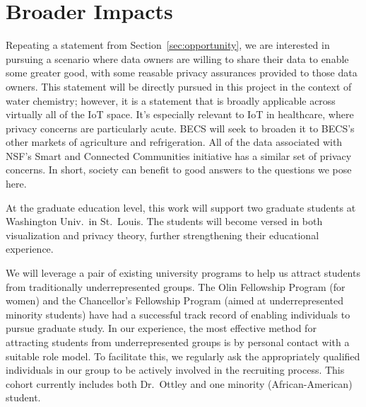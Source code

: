 \section{Broader Impacts}
\label{sec:broader}

Repeating a statement from Section~\ref{sec:opportunity},
we are interested in pursuing a scenario
where data owners are willing to share their data to enable some greater
good, with some reasable privacy assurances provided to those data owners.
This statement will be directly pursued in this project in the context of water
chemistry; however, it is a statement that is broadly applicable
across virtually all of the IoT space.
It's especially relevant to IoT in healthcare, where privacy concerns
are particularly acute.
BECS will seek to broaden it to BECS's other markets of agriculture
and refrigeration.
All of the data associated with NSF's Smart and Connected Communities
initiative has a similar set of privacy concerns.
In short, society can benefit to good answers to the questions we pose here.

At the graduate education level, this work will support two graduate
students at Washington Univ.~in St.~Louis.
The students will become versed in both visualization and
privacy theory, further strengthening their educational experience.

We will leverage a pair of existing university programs to help us
attract students from traditionally underrepresented groups.  The Olin
Fellowship Program (for women) and the Chancellor's Fellowship Program
(aimed at underrepresented minority students) have had a successful track
record of enabling individuals to pursue graduate study.  In our
experience, the most effective method for attracting students from
underrepresented groups is by personal contact with a suitable role
model.  To facilitate this, we regularly ask the appropriately
qualified individuals in our group to be actively involved in the
recruiting process.  This cohort currently includes both Dr.~Ottley
and one minority (African-American) student.
